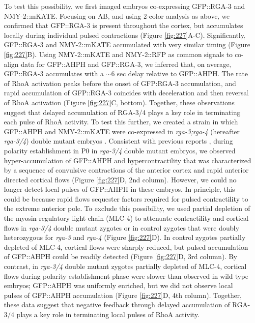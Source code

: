 To test this possibility, we first imaged embryos co-expressing GFP::RGA-3 and NMY-2::mKATE. Focusing on AB, and using 2-color analysis as above, we confirmed that GFP::RGA-3 is present throughout the cortex, but accumulates locally during individual pulsed contractions (Figure \ref{fig:227}A-C). Significantly, GFP::RGA-3 and NMY-2::mKATE accumulated with very similar timing (Figure \ref{fig:227}B). Using NMY-2::mKATE and NMY-2::RFP  as common signals to co-align data for GFP::AHPH and GFP::RGA-3, we inferred that, on average, GFP::RGA-3 accumulates with a $\sim$6 sec delay relative to GFP::AHPH. The rate of RhoA activation peaks before the onset of GFP:RGA-3 accumulation, and rapid accumulation of GFP::RGA-3 coincides with deceleration and then reversal of RhoA activation (Figure \ref{fig:227}C, bottom). Together, these observations suggest that delayed accumulation of RGA-3/4 plays a key role in terminating each pulse of RhoA activity. To test this further, we created a strain in which GFP::AHPH and NMY-2::mKATE were co-expressed in \textit{rga-3;rga-4} (hereafter \textit{rga-3/4}) double mutant embryos \cite{Zanin:2013el}. Consistent with previous reports \cite{Schonegg:2007if, Zanin:2013el, Schmutz:2007jq, Tse:2012fp}, during polarity establishment in P0 in \textit{rga-3/4} double mutant embryos, we observed hyper-accumulation of GFP::AHPH and hypercontractility that was characterized by a sequence of convulsive contractions of the anterior cortex and rapid anterior directed cortical flows (Figure \ref{fig:227}D, 2nd column).  However, we could no longer detect local pulses of GFP::AHPH in these embryos.  In principle, this could be because rapid flows sequester factors required for pulsed contractility to the extreme anterior pole. To exclude this possibility, we used partial depletion of the myosin regulatory light chain (MLC-4) to attenuate contractility and cortical flows in \textit{rga-3/4} double mutant zygotes or in control zygotes that were doubly heterozygous for \textit{rga-3} and \textit{rga-4} (Figure \ref{fig:227}D).  In control zygotes partially depleted of MLC-4, cortical flows were sharply reduced, but pulsed accumulation of GFP::AHPH could be readily detected (Figure \ref{fig:227}D, 3rd column). By contrast, in \textit{rga-3/4} double mutant zygotes partially depleted of MLC-4, cortical flows during polarity establishment phase were slower than observed in wild type embryos; GFP::AHPH was uniformly enriched, but we did not observe local pulses of GFP::AHPH accumulation (Figure \ref{fig:227}D, 4th column).  Together, these data suggest that negative feedback through delayed accumulation of RGA-3/4 plays a key role in terminating local pulses of RhoA activity.


